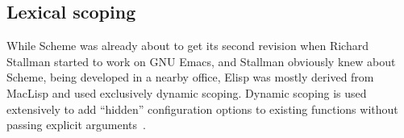 \documentclass[format=acmsmall, review=false, screen=true]{acmart}
\newcommand \Elisp {Elisp}
\begin{document}
\subsection{Lexical scoping}
\label{sec:lexical-scoping}

While Scheme was already about to get its second revision when Richard
Stallman started to work on GNU Emacs, and Stallman obviously knew about
Scheme, being developed in a nearby office, \Elisp{} was mostly derived from
MacLisp and used exclusively dynamic scoping.  Dynamic scoping is used
extensively to add ``hidden'' configuration options to existing
functions without passing explicit arguments~\cite{Stallman1981}.

\end{document}
